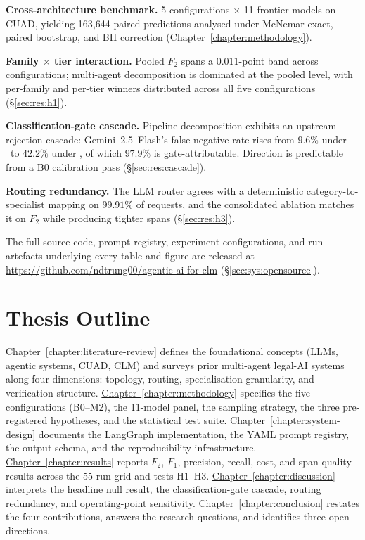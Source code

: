 \begin{description}[leftmargin=3em, labelwidth=2.5em, itemsep=4pt]
  \item[\textbf{C1}] \textbf{Cross-architecture benchmark.} 5 configurations
    $\times$ 11 frontier models on CUAD, yielding 163{,}644 paired predictions
    analysed under McNemar exact, paired bootstrap, and BH correction
    (Chapter~\ref{chapter:methodology}).
  \item[\textbf{C2}] \textbf{Family $\times$ tier interaction.} Pooled $F_2$
    spans a $0.011$-point band across configurations; multi-agent decomposition
    is dominated at the pooled level, with per-family and per-tier winners
    distributed across all five configurations (\S\ref{sec:res:h1}).
  \item[\textbf{C3}] \textbf{Classification-gate cascade.} Pipeline
    decomposition exhibits an upstream-rejection cascade: Gemini~2.5~Flash's
    false-negative rate rises from $9.6\%$ under \cfgZS\ to $42.2\%$ under \cfgCX,
    of which $97.9\%$ is gate-attributable. Direction is predictable from a B0
    calibration pass (\S\ref{sec:res:cascade}).
  \item[\textbf{C4}] \textbf{Routing redundancy.} The LLM router agrees with
    a deterministic category-to-specialist mapping on $99.91\%$ of requests,
    and the consolidated ablation matches it on $F_2$ while producing tighter
    spans (\S\ref{sec:res:h3}).
\end{description}

\noindent
The full source code, prompt registry, experiment configurations, and run
artefacts underlying every table and figure are released at
\url{https://github.com/ndtrung00/agentic-ai-for-clm}
(\S\ref{sec:sys:opensource}).

\section{Thesis Outline}\label{sec:outline}

\hyperref[chapter:literature-review]{Chapter~\ref*{chapter:literature-review}}
defines the foundational concepts (LLMs, agentic systems, CUAD, CLM) and surveys
prior multi-agent legal-AI systems along four dimensions: topology, routing,
specialisation granularity, and verification structure.
\hyperref[chapter:methodology]{Chapter~\ref*{chapter:methodology}} specifies the
five configurations (B0--M2), the 11-model panel, the sampling strategy, the three
pre-registered hypotheses, and the statistical test suite.
\hyperref[chapter:system-design]{Chapter~\ref*{chapter:system-design}} documents
the LangGraph implementation, the YAML prompt registry, the output schema, and the
reproducibility infrastructure.
\hyperref[chapter:results]{Chapter~\ref*{chapter:results}} reports $F_2$, $F_1$,
precision, recall, cost, and span-quality results across the 55-run grid and tests
H1--H3.
\hyperref[chapter:discussion]{Chapter~\ref*{chapter:discussion}} interprets the
headline null result, the classification-gate cascade, routing redundancy, and
operating-point sensitivity.
\hyperref[chapter:conclusion]{Chapter~\ref*{chapter:conclusion}} restates the four
contributions, answers the research questions, and identifies three open directions.
